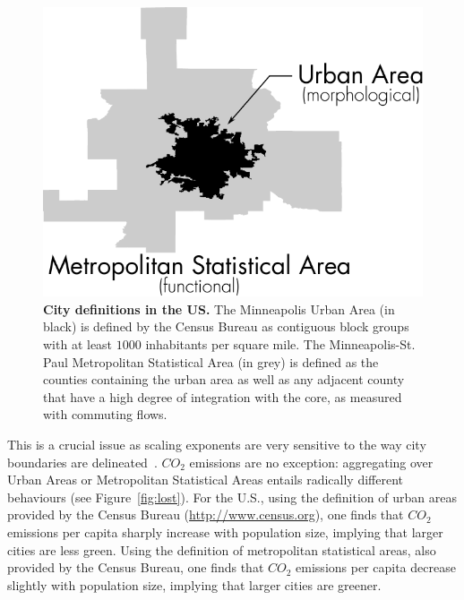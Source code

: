 \begin{figure}
    \centering
    \includegraphics[width=\textwidth]{gfx/chapter-scaling/city_definition.pdf}
    \caption{{\bf City definitions in the US.} The Minneapolis Urban Area (in
    black) is defined by the Census Bureau as contiguous block groups with at
least $1000$ inhabitants per square mile. The Minneapolis-St. Paul Metropolitan
Statistical Area (in grey) is defined as the counties containing the urban area
as well as any adjacent county that have a high degree of integration with the
core, as measured with commuting flows.\label{fig:two_definitions}}
\end{figure}


This is a crucial issue as scaling exponents are very sensitive to the
way city boundaries are delineated~\cite{Arcaute:2014}.  $CO_2$ emissions are no exception:
aggregating over Urban Areas or Metropolitan Statistical Areas entails radically
different behaviours (see Figure~\ref{fig:lost}). For the U.S., using the
definition of urban areas provided by the Census Bureau
(\url{http://www.census.org}), one finds that $CO_2$ emissions per capita
sharply increase with population size, implying that larger cities are less
green. Using the definition of metropolitan statistical areas, also provided by
the Census Bureau, one finds that $CO_2$ emissions per capita decrease slightly
with population size, implying that larger cities are greener.\\

